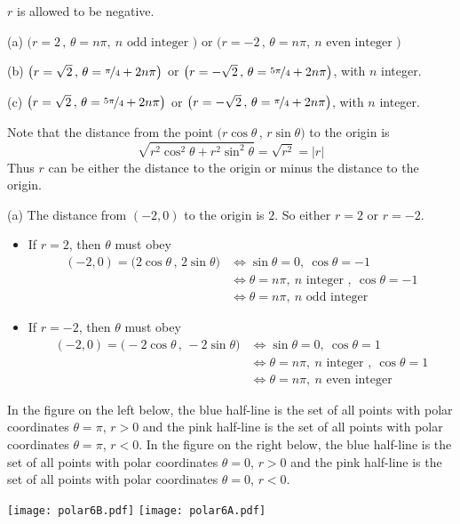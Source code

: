 \begin{hint} 
$r$ is allowed to be negative.
\end{hint}

\begin{answer} 
(a) $\big(r=2\,,\,\theta= n\pi,\ n\text{ odd integer }\big)$ or 
    $\big(r=-2\,,\,\theta= n\pi,\ n\text{ even integer }\big)$ 

(b) $\big(r=\sqrt{2}\,,\,\theta= \nicefrac{\pi}{4} + 2n\pi\big)$ or 
    $\big(r=-\sqrt{2}\,,\,\theta= \nicefrac{5\pi}{4} + 2n\pi\big)$,
    with $n$ integer. 

(c) $\big(r=\sqrt{2}\,,\,\theta= \nicefrac{5\pi}{4} + 2n\pi\big)$ or 
    $\big(r=-\sqrt{2}\,,\,\theta= \nicefrac{\pi}{4} + 2n\pi\big)$,
    with $n$ integer. 
\end{answer}


\begin{solution}
Note that the distance from the point $\big(r\cos\theta\,,\,r\sin\theta\big)$
to the origin is
\begin{equation*}
\sqrt{r^2\cos^2\theta + r^2\sin^2\theta}
=\sqrt{r^2}
=|r|
\end{equation*}
Thus $r$ can be either the distance to the origin or minus the distance to the
origin.

(a) 
The distance from $(-2,0)$ to the origin is $2$. So either $r=2$ or $r=-2$.
\begin{itemize}
\item If $r=2$, then $\theta$ must obey 
\begin{align*}
(-2,0) = \big(2\cos\theta\,,\,2\sin\theta\big)
&\iff \sin\theta=0,\ \cos\theta=-1 \\
&\iff \theta= n\pi,\ n\text{ integer },\ \cos\theta=-1 \\
&\iff \theta= n\pi,\ n\text{ odd integer }
\end{align*}
\item If $r=-2$, then $\theta$ must obey 
\begin{align*}
(-2,0) = \big(-2\cos\theta\,,\,-2\sin\theta\big)
&\iff \sin\theta=0,\ \cos\theta=1 \\
&\iff \theta= n\pi,\ n\text{ integer },\ \cos\theta=1 \\
&\iff \theta= n\pi,\ n\text{ even integer }
\end{align*}
\end{itemize}
In the figure on the left below, the blue half-line is the set of all points 
with polar coordinates $\theta=\pi$, $r>0$ and the pink half-line is the set 
of all points  with polar coordinates $\theta=\pi$, $r<0$. 
In the figure on the right below, the blue half-line is the set of all points 
with polar coordinates $\theta=0$, $r>0$ and the pink half-line is the set 
of all points  with polar coordinates $\theta=0$, $r<0$. 
\begin{center}
  \texttt{[image: polar6B.pdf]}\qquad
  \texttt{[image: polar6A.pdf]}
\end{center}



\end{solution}
